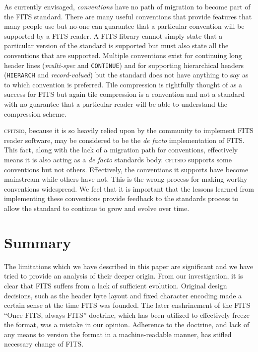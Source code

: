 \documentclass[final,authoryear,5p,times,twocolumn]{elsarticle}
\begin{document}
{{As currently envisaged, \emph{conventions} have no path of migration
to become part of the FITS standard. There are many useful conventions
that provide features that many people use but no-one can guarantee
that a particular convention will be supported by a FITS reader. A
FITS library cannot simply state that a particular version of the
standard is supported but must also state all the conventions that are
supported. Multiple conventions exist for
continuing long header lines (\emph{multi-spec} and \texttt{CONTINUE})
and for supporting hierarchical headers (\texttt{HIERARCH} and
\emph{record-valued}) but the standard does not have anything to say
as to which convention is preferred. Tile compression is rightfully
thought of as a success for FITS but again tile compression
\citep[e.g.,][]{2007ASPC..376..483S,2009PASP..121..414P} is a
convention and not a standard with no guarantee that a particular
reader will be able to understand the compression scheme.

\textsc{cfitsio,} because it is so heavily relied upon by the 
community to implement FITS reader software, may be considered to
be the \emph{de facto} implementation of FITS. This fact, along
with the lack of a migration path for conventions, effectively means
it is also acting as a \emph{de facto} standards body. \textsc{cfitsio}
supports some conventions but not others. 
Effectively, the conventions it supports have become mainstream 
while others have not. This is the wrong process for
making worthy conventions widespread. We feel that it is important 
that the lessons learned from implementing these conventions provide
feedback to the standards process to allow the standard to continue 
to grow and evolve over time.


\section{Summary}


The limitations which we have described in this paper are significant
and we have tried to provide an analysis of their deeper origin.
From our investigation, it is clear that FITS suffers from a lack of
sufficient evolution. Original design decisions, such as the header
byte layout and fixed character encoding made a certain sense at the
time FITS was founded. The later enshrinement of the FITS ``Once FITS, 
always FITS'' doctrine, which has been utilized to effectively freeze 
the format, was a mistake in our opinion. Adherence to the doctrine, 
and lack of any means to version the format in a machine-readable manner, 
has stifled necessary change of FITS.


}}
\end{document}
